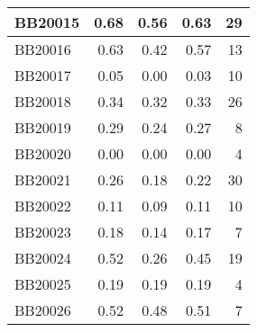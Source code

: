 \begin{longtable}{|l|r|r|r||r|}
	\hline
	BB20015 & \cellcolor[rgb]{ .988,  1,  .992}0.68 & \cellcolor[rgb]{ .384,  .745,  .478}0.56 & \cellcolor[rgb]{ .753,  .898,  .792}0.63 & \cellcolor[rgb]{ .976,  .431,  .439}29 \\
	\hline
	BB20016 & \cellcolor[rgb]{ .988,  1,  .992}0.63 & \cellcolor[rgb]{ .384,  .745,  .478}0.42 & \cellcolor[rgb]{ .839,  .933,  .863}0.57 & \cellcolor[rgb]{ .984,  .741,  .749}13 \\
	\hline
	BB20017 & \cellcolor[rgb]{ .988,  1,  .992}0.05 & \cellcolor[rgb]{ .384,  .745,  .478}0.00 & \cellcolor[rgb]{ .745,  .898,  .784}0.03 & \cellcolor[rgb]{ .984,  .796,  .808}10 \\
	\hline
	BB20018 & \cellcolor[rgb]{ .988,  1,  .992}0.34 & \cellcolor[rgb]{ .384,  .745,  .478}0.32 & \cellcolor[rgb]{ .8,  .918,  .831}0.33 & \cellcolor[rgb]{ .976,  .49,  .498}26 \\
	\hline
	BB20019 & \cellcolor[rgb]{ .988,  1,  .992}0.29 & \cellcolor[rgb]{ .384,  .745,  .478}0.24 & \cellcolor[rgb]{ .761,  .902,  .796}0.27 & \cellcolor[rgb]{ .984,  .835,  .847}8 \\
	\hline
	BB20020 & \cellcolor[rgb]{ .988,  1,  .992}0.00 & \cellcolor[rgb]{ .988,  1,  .992}0.00 & \cellcolor[rgb]{ .988,  1,  .992}0.00 & \cellcolor[rgb]{ .988,  .914,  .925}4 \\
	\hline
	BB20021 & \cellcolor[rgb]{ .988,  1,  .992}0.26 & \cellcolor[rgb]{ .384,  .745,  .478}0.18 & \cellcolor[rgb]{ .686,  .871,  .733}0.22 & \cellcolor[rgb]{ .973,  .412,  .42}30 \\
	\hline
	BB20022 & \cellcolor[rgb]{ .988,  1,  .992}0.11 & \cellcolor[rgb]{ .384,  .745,  .478}0.09 & \cellcolor[rgb]{ .925,  .973,  .937}0.11 & \cellcolor[rgb]{ .984,  .796,  .808}10 \\
	\hline
	BB20023 & \cellcolor[rgb]{ .988,  1,  .992}0.18 & \cellcolor[rgb]{ .384,  .745,  .478}0.14 & \cellcolor[rgb]{ .902,  .961,  .918}0.17 & \cellcolor[rgb]{ .988,  .855,  .867}7 \\
	\hline
	BB20024 & \cellcolor[rgb]{ .988,  1,  .992}0.52 & \cellcolor[rgb]{ .384,  .745,  .478}0.26 & \cellcolor[rgb]{ .824,  .929,  .851}0.45 & \cellcolor[rgb]{ .98,  .624,  .635}19 \\
	\hline
	BB20025 & \cellcolor[rgb]{ .988,  1,  .992}0.19 & \cellcolor[rgb]{ .988,  1,  .992}0.19 & \cellcolor[rgb]{ .988,  1,  .992}0.19 & \cellcolor[rgb]{ .988,  .914,  .925}4 \\
	\hline
	BB20026 & \cellcolor[rgb]{ .988,  1,  .992}0.52 & \cellcolor[rgb]{ .384,  .745,  .478}0.48 & \cellcolor[rgb]{ .898,  .961,  .918}0.51 & \cellcolor[rgb]{ .988,  .855,  .867}7 \\

\end{longtable}
